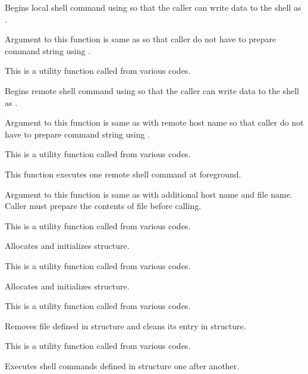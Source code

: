   
      Begins local shell command using  so that the caller can write data to
	  the shell as .
      
      Argument to this function is same as  so that caller do not have to prepare
      command string using .
      
      This is a utility function called from various codes.
  
  
      Begins remote shell command using  so that the caller can write data to
	  the shell as .
      
      Argument to this function is same as  with remote host name so that
	  caller do not have to prepare command string using .
      
      This is a utility function called from various codes.
  
  
      This function executes one remote shell command at foreground.
      
      Argument to this function is same as  with additional host name and
	   file name.
      Caller must prepare the contents of  file before calling.
      
      This is a utility function called from various codes.
  
  
      Allocates and initializes  structure.
      
      This is a utility function called from various codes.
  
  
      Allocates and initializes  structure.
      
      This is a utility function called from various codes.
  
  
      Removes  file defined in  structure and cleans its entry in  structure.
      
      This is a utility function called from various codes.
  
  
      Executes shell commands defined in  structure one after another.
      
